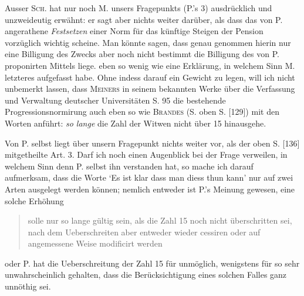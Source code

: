 Ausser \textsc{Sch.} hat nur noch M. unsers Fragepunkts (P.’s 3) ausdrücklich und unzweideutig erwähnt: er sagt aber nichts weiter darüber, als dass das von P. angerathene \textit{Festsetzen} einer Norm für das künftige Steigen der Pension vorzüglich wichtig scheine. Man könnte sagen, dass genau genommen hierin nur eine Billigung des Zwecks aber noch nicht bestimmt die Billigung des von P. proponirten Mittels liege. eben so wenig wie eine Erklärung, in welchem Sinn M. letzteres aufgefasst habe. Ohne indess darauf ein Gewicht zu legen, will ich nicht unbemerkt lassen, dass \textsc{Meiners} in seinem bekannten Werke über die Verfassung und Verwaltung deutscher Universitäten S. 95 die bestehende Progressionsnormirung auch eben so wie \textsc{Brandes} (S. oben S. [129]) mit den Worten anführt: \textit{so lange} die Zahl der Witwen nicht über 15 hinausgehe.

Von P. selbst liegt über unsern Fragepunkt nichts weiter vor, als der oben S. [136] mitgetheilte Art. 3. Darf ich noch einen Augenblick bei der Frage verweilen, in welchem Sinn denn P. selbst ihn verstanden hat, so mache ich darauf aufmerksam, dass die Worte ‘Es ist klar dass man diess thun kann’ nur auf zwei Arten ausgelegt werden können; nemlich entweder ist P.’s Meinung gewesen, eine solche Erhöhung
\begin{quote}
solle nur so lange gültig sein, als die Zahl 15 noch nicht überschritten sei, nach dem Ueberschreiten aber entweder wieder cessiren oder auf angemessene Weise modificirt werden
\end{quote}
\noindent oder P. hat die Ueberschreitung der Zahl 15 für unmöglich, wenigstens für so sehr unwahrscheinlich gehalten, dass die Berücksichtigung eines solchen Falles ganz unnöthig sei.
